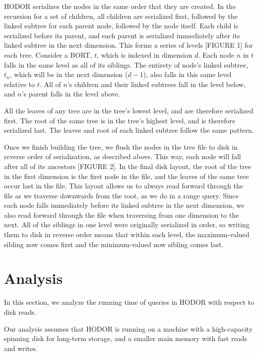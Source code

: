 \documentclass[11pt, oneside]{article}
\begin{document}
HODOR serializes the nodes in the same order that they are created. In the
recursion for a set of children, all children are serialized first, followed by
the linked subtree for each parent node, followed by the node itself. Each child
is serialized before its parent, and each parent is serialized immediately after
its linked subtree in the next dimension. This forms a series of levels [FIGURE
1] for each tree. Consider a BORT, $t$, which is indexed in dimension $d$. Each
node $n$ in $t$ falls in the same level as all of its siblings. The entirety of
node's linked subtree, $t_n$, which will be in the next dimension ($d - 1$),
also falls in this same level relative to $t$. All of $n$'s children and their
linked subtrees fall in the level below, and $n$'s parent falls in the level
above. 

All the leaves of any tree are in the tree's lowest level, and are therefore
serialized first. The root of the same tree is in the tree's highest level, and
is therefore serialized last. The leaves and root of each linked subtree follow
the same pattern. 

Once we finish building the tree, we flush the nodes in the tree file to disk
in reverse order of serialization, as described above. This way, each node will
fall after all of its ancestors [FIGURE 2]. In the final disk layout, the root
of the tree in the first dimension is the first node in the file, and the leaves
of the same tree occur last in the file. This layout allows us to always read
forward through the file as we traverse downwards from the root, as we do in a
range query. Since each node falls immediately before its linked subtree in the
next dimension, we also read forward through the file when traversing from one
dimension to the next. All of the siblings in one level were originally
serialized in order, so writing them to disk in reverse order means that within
each level, the maximum-valued sibling now comes first and the minimum-valued
now sibling comes last. 

\section{Analysis}

In this section, we analyze the running time of queries in HODOR with respect to
disk reads.

Our analysis assumes that HODOR is running on a machine with a high-capacity
spinning disk for long-term storage, and a smaller main memory with fast 
reads and writes.
\end{document}
